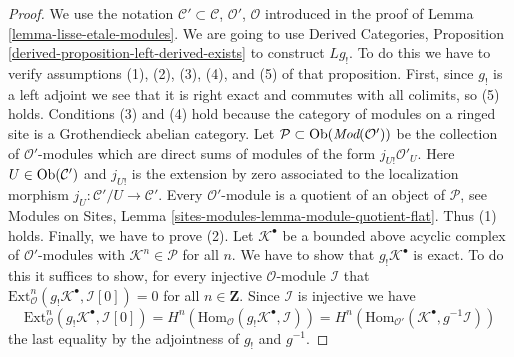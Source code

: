 \begin{proof}
We use the notation
$\mathcal{C}' \subset \mathcal{C}$, $\mathcal{O}'$, $\mathcal{O}$
introduced in the proof of Lemma \ref{lemma-lisse-etale-modules}.
We are going to use
Derived Categories, Proposition \ref{derived-proposition-left-derived-exists}
to construct $Lg_!$. To do this we have to verify assumptions
(1), (2), (3), (4), and (5) of that proposition.
First, since $g_!$ is a left adjoint
we see that it is right exact and commutes with all colimits, so
(5) holds. Conditions (3) and (4) hold because the category of modules
on a ringed site is a Grothendieck abelian category.
Let $\mathcal{P} \subset \mathop{\rm Ob}\nolimits(\textit{Mod}(\mathcal{O}'))$
be the collection of $\mathcal{O}'$-modules which are direct
sums of modules of the form $j_{U!}\mathcal{O}'_U$. Here
$U \in \mathop{\rm Ob}\nolimits(\mathcal{C}')$ and $j_{U!}$
is the extension by zero associated to the localization morphism
$j_U : \mathcal{C}'/U \to \mathcal{C}'$.
Every $\mathcal{O}'$-module is a quotient of an object of
$\mathcal{P}$, see
Modules on Sites, Lemma \ref{sites-modules-lemma-module-quotient-flat}.
Thus (1) holds. Finally, we have to prove (2).
Let $\mathcal{K}^\bullet$ be a bounded above acyclic complex of
$\mathcal{O}'$-modules with $\mathcal{K}^n \in \mathcal{P}$ for all $n$.
We have to show that $g_!\mathcal{K}^\bullet$ is
exact. To do this it suffices to show, for every injective
$\mathcal{O}$-module $\mathcal{I}$ that
$\text{Ext}^n_{\mathcal{O}}(g_!\mathcal{K}^\bullet, \mathcal{I}[0]) = 0$
for all $n \in \mathbf{Z}$. Since $\mathcal{I}$ is injective
we have
$$
\text{Ext}^n_{\mathcal{O}}(g_!\mathcal{K}^\bullet, \mathcal{I}[0]) =
H^n(\text{Hom}_{\mathcal{O}}(g_!\mathcal{K}^\bullet, \mathcal{I})) =
H^n(\text{Hom}_{\mathcal{O}'}(\mathcal{K}^\bullet, g^{-1}\mathcal{I}))
$$
the last equality by the adjointness of $g_!$ and $g^{-1}$.


\end{proof}
